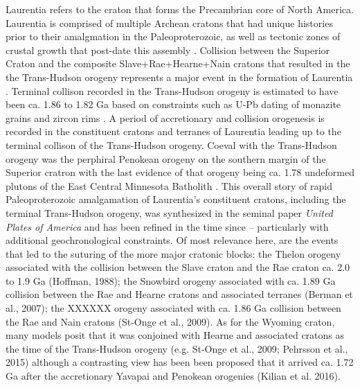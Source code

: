 \documentclass[11pt,letterpaper]{article}
\begin{document}
Laurentia refers to the craton that forms the Precambrian core of North America. Laurentia is comprised of multiple Archean cratons that had unique histories prior to their amalgmation in the Paleoproterozoic, as well as tectonic zones of crustal growth that post-date this assembly \citep{Hoffman1988a, Whitmeyer2007a}. Collision between the Superior Craton and the composite Slave+Rae+Hearne+Nain cratons that resulted in the the Trans-Hudson orogeny represents a major event in the formation of Laurentia \citep{Corrigan2009a}. Terminal collison recorded in the Trans-Hudson orogeny is estimated to have been ca. 1.86 to 1.82 Ga based on constraints such as U-Pb dating of monazite grains and zircon rims \citep[e.g.]{Skipton2016a, Weller2017a}. A period of accretionary and collision orogenesis is recorded in the constituent cratons and terranes of Laurentia leading up to the terminal collison of the Trans-Hudson orogeny. Coeval with the Trans-Hudson orogeny was the perphiral Penokean orogeny on the southern margin of the Superior cratron with the last evidence of that orogeny being ca. 1.78 undeformed plutons of the East Central Minnesota Batholith \citep{Holm2005a}. This overall story of rapid Paleoproterozoic amalgamation of Laurentia's constituent cratons, including the terminal Trans-Hudson orogeny, was synthesized in the seminal paper \textit{United Plates of America} \citep{Hoffman1988a} and has been refined in the time since -- particularly with additional geochronological constraints. Of most relevance here, are the events that led to the suturing of the more major cratonic blocks: the Thelon orogeny associated with the collision between the Slave craton and the Rae craton ca. 2.0 to 1.9 Ga (Hoffman, 1988); the Snowbird orogeny associated with ca. 1.89 Ga collision between the Rae and Hearne cratons and associated terranes (Berman et al., 2007); the XXXXXX orogeny associated with ca. 1.86 Ga collision between the Rae and Nain cratons (St-Onge et al., 2009). As for the Wyoming craton, many models posit that it was conjoined with Hearne and associated cratons as the time of the Trans-Hudson orogeny (e.g. St-Onge et al., 2009; Pehrsson et al., 2015) although a contrasting view has been been proposed that it arrived ca. 1.72 Ga after the accretionary Yavapai and Penokean orogenies (Kilian et al. 2016).  
\end{document}
